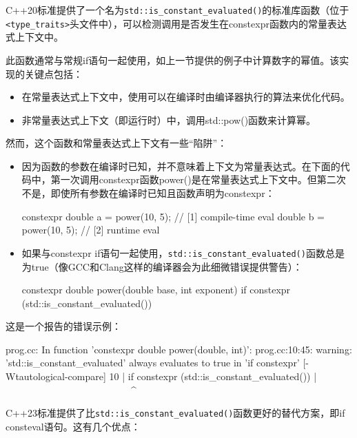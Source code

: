 
C++20标准提供了一个名为\verb|std::is_constant_evaluated()|的标准库函数（位于\verb|<type_traits>|头文件中），可以检测调用是否发生在constexpr函数内的常量表达式上下文中。

此函数通常与常规if语句一起使用，如上一节提供的例子中计算数字的幂值。该实现的关键点包括：

\begin{itemize}
\item
在常量表达式上下文中，使用可以在编译时由编译器执行的算法来优化代码。

\item
非常量表达式上下文（即运行时）中，调用std::pow()函数来计算幂。
\end{itemize}

然而，这个函数和常量表达式上下文有一些“陷阱”：

\begin{itemize}
\item
因为函数的参数在编译时已知，并不意味着上下文为常量表达式。在下面的代码中，第一次调用constexpr函数power()是在常量表达式上下文中。但第二次不是，即使所有参数在编译时已知且函数声明为constexpr：

\begin{cpp}
constexpr double a = power(10, 5); // [1] compile-time eval
double b = power(10, 5);           // [2] runtime eval
\end{cpp}

\item
如果与constexpr if语句一起使用，\verb|std::is_constant_evaluated()|函数总是为true（像GCC和Clang这样的编译器会为此细微错误提供警告）：

\begin{cpp}
constexpr double power(double base, int exponent)
{
    if constexpr (std::is_constant_evaluated())
    {
    }
}
\end{cpp}
\end{itemize}

这是一个报告的错误示例：

\begin{shell}
prog.cc: In function 'constexpr double power(double, int)':
prog.cc:10:45: warning: 'std::is_constant_evaluated' always evaluates to true in 'if constexpr' [-Wtautological-compare]
   10 |     if constexpr (std::is_constant_evaluated())
      |                   ~~~~~~~~~~~~~~~~~~~~~~~~~~^~
\end{shell}

C++23标准提供了比\verb|std::is_constant_evaluated()|函数更好的替代方案，即if consteval语句。这有几个优点：

